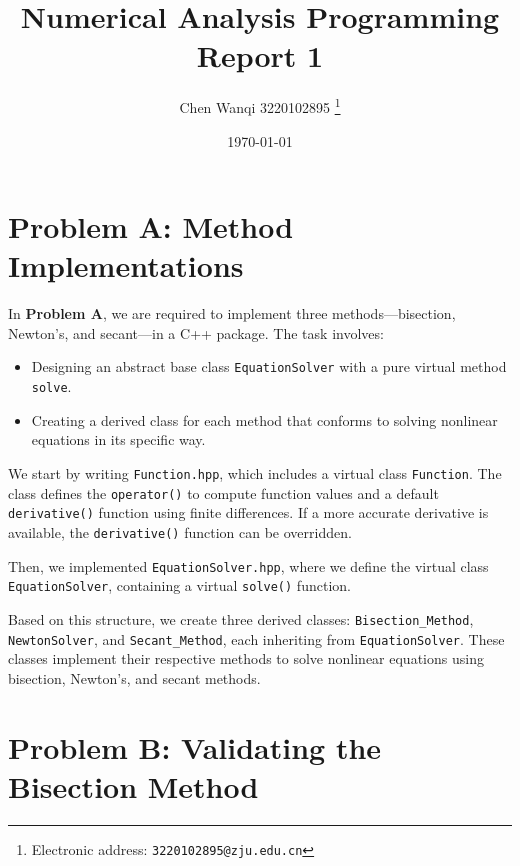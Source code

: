 \documentclass[a4paper]{article}
\begin{document}
\title{Numerical Analysis Programming Report 1}

\author{Chen Wanqi 3220102895
  \thanks{Electronic address: \texttt{3220102895@zju.edu.cn}}}

\date{\today}

\maketitle

\section{Problem A: Method Implementations}

In \textbf{Problem A}, we are required to implement three methods—bisection, Newton's, and secant—in a C++ package. The task involves:

\begin{itemize}
    \item Designing an abstract base class \texttt{EquationSolver} with a pure virtual method \texttt{solve}.
    \item Creating a derived class for each method that conforms to solving nonlinear equations in its specific way.
\end{itemize}

We start by writing \texttt{Function.hpp}, which includes a virtual class \texttt{Function}. The class defines the \texttt{operator()} to compute function values and a default \texttt{derivative()} function using finite differences. If a more accurate derivative is available, the \texttt{derivative()} function can be overridden.

Then, we implemented \texttt{EquationSolver.hpp}, where we define the virtual class \texttt{EquationSolver}, containing a virtual \texttt{solve()} function.

Based on this structure, we create three derived classes: \texttt{Bisection\_Method}, \texttt{NewtonSolver}, and \texttt{Secant\_Method}, each inheriting from \texttt{EquationSolver}. These classes implement their respective methods to solve nonlinear equations using bisection, Newton's, and secant methods.

\section{Problem B: Validating the Bisection Method}
\end{document}
